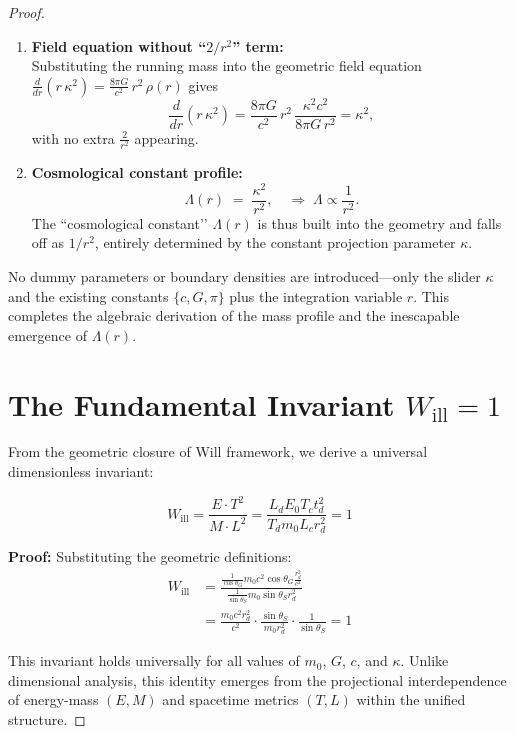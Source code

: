 \documentclass{article}
\begin{document}
\begin{proof}
\begin{enumerate}
  \item \textbf{Field equation without “\(2/r^2\)” term:}\\
  Substituting the running mass into the geometric field equation
  \(\displaystyle \frac{d}{dr}(r\,\kappa^2)
     =\frac{8\pi G}{c^2}\,r^2\,\rho(r)\)
  gives
  \[
    \frac{d}{dr}(r\,\kappa^2)
    =\frac{8\pi G}{c^2}\,r^2\,\frac{\kappa^2c^2}{8\pi G\,r^2}
    =\kappa^2,
  \]
  with no extra \(\tfrac{2}{r^2}\) appearing.
  
  \item \textbf{Cosmological constant profile:}
  \[
    \Lambda(r)
    \;=\;
    \frac{\kappa^2}{r^2},
    \quad\Longrightarrow\;
    \Lambda\propto \frac{1}{r^2}.
  \]
  The “cosmological constant’’ \(\Lambda(r)\) is thus built into the geometry and falls off as \(1/r^2\), entirely determined by the constant projection parameter \(\kappa\).
\end{enumerate}

No dummy parameters or boundary densities are introduced—only the slider \(\kappa\) and the existing constants \(\{c,G,\pi\}\) plus the integration variable \(r\). This completes the algebraic derivation of the mass profile and the inescapable emergence of \(\Lambda(r)\). 


\section{The Fundamental Invariant $W_{\text{ill}} = 1$}

From the geometric closure of Will framework, we derive a universal dimensionless invariant:

\begin{equation}
W_{\text{ill}} = \frac{E \cdot T^2}{M \cdot L^2} = \frac{L_d E_0 T_c t^2_{d}}{T_d m_0 L_c r^2_{d}} = 1
\end{equation}

\textbf{Proof:} Substituting the geometric definitions:
\begin{align}
W_{\text{ill}} &= \frac{\frac{1}{\cos \theta_G} m_0c^2 \cos \theta_G \frac{r^2_{d}}{c^2}}{\frac{1}{\sin\theta_S} m_0 \sin\theta_S r^2_{d}} \\
&= \frac{m_0c^2 r^2_{d}}{c^2} \cdot \frac{\sin\theta_S}{m_0 r^2_{d}} \cdot \frac{1}{\sin\theta_S} = 1
\end{align}

This invariant holds universally for all values of $m_0$, $G$, $c$, and $\kappa$. Unlike dimensional analysis, this identity emerges from the projectional interdependence of energy-mass $(E,M)$ and spacetime metrics $(T,L)$ within the unified structure.


\end{proof}
\end{document}
